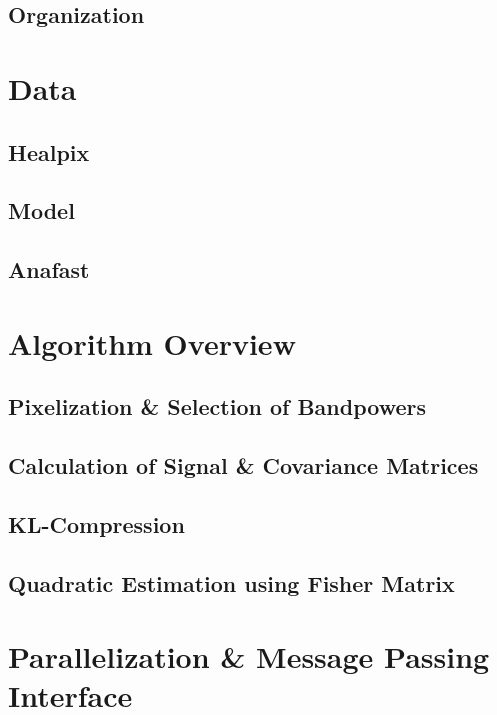 \documentclass[5p]{elsarticle}
\begin{document}
\subsection{Organization}

\section{Data}

\subsection{Healpix} 
\subsection{Model} 
\subsection{Anafast}

\section{Algorithm Overview}

\subsection{Pixelization \& Selection of Bandpowers} 
\subsection{Calculation of Signal \& Covariance Matrices} 
\subsection{KL-Compression} 
\subsection{Quadratic Estimation using Fisher Matrix} 

\section{Parallelization \& Message Passing Interface}
\end{document}
